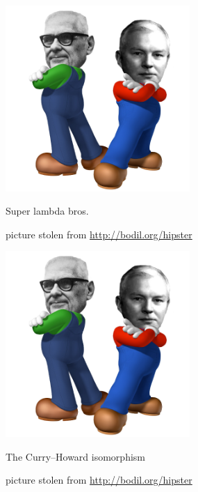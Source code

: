 \documentclass[t,compress,hyperref={hidelinks}]{beamer}
\begin{document}
\begin{frame}

\begin{center}

\vspace*{\fill}

\includegraphics[height=200pt]{church-curry.png}

\color{OxfordOlive}\LARGE Super lambda bros.

\vspace*{\fill}

\tiny\color{gray} picture stolen from \url{http://bodil.org/hipster}

\end{center}

\end{frame}

\addtocounter{framenumber}{-1}

\begin{frame}

\begin{center}

\vspace*{\fill}

\includegraphics[height=200pt]{church-curry.png}

\color{OxfordOlive}\LARGE The Curry--Howard isomorphism

\vspace*{\fill}

\tiny\color{gray} picture stolen from \url{http://bodil.org/hipster}

\end{center}

\end{frame}
\end{document}
